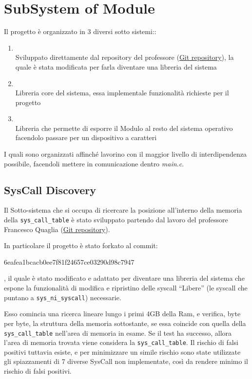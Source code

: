 \section{SubSystem of Module}

Il progetto è organizzato in 3 diversi sotto sistemi::
\begin{enumerate}
\item {} \\
    Sviluppato direttamente dal repository del professore
    (\href{https://github.com/FrancescoQuaglia/Linux-sys_call_table-discoverer}{Git repository}), la quale è stata
    modificata per farla diventare una libreria del sistema
\item {} \\
    Libreria core del sistema, essa implementale funzionalità richieste per il progetto
\item {} \\
    Libreria che permette di esporre il Modulo al resto del sistema operativo facendolo passare per un dispositivo a
    caratteri
\end{enumerate}

I quali sono organizzati affinché lavorino con il maggior livello di interdipendenza possibile, facendoli mettere in
comunicazione dentro \textit{main.c}.

\subsection{SysCall Discovery} \label{SysCallDiscovery}

Il Sotto-sistema che si occupa di ricercare la posizione all'interno della memoria della \verb|sys_call_table| è stato
sviluppato partendo dal lavoro del professore Francesco Quaglia
(\href{https://github.com/FrancescoQuaglia/Linux-sys_call_table-discoverer}{Git repository}).

In particolare il progetto è stato forkato al commit:
\begin{verb}6eafea1bcacb0ee7f81f24657ce03290d98c7947\end{verb}, il quale è stato modificato e
adattato per diventare una libreria del sistema che espone la funzionalità di modifica e ripristino delle syscall
``Libere'' (le syscall che puntano a \verb|sys_ni_syscall|) necessarie.

Esso comincia una ricerca lineare lungo i primi 4GB della Ram, e verifica, byte per byte, la struttura della memoria
sottostante, se essa coincide con quella della \verb|sys_call_table| nell'area di memoria in esame.
Se il test ha successo, allora l'area di memoria trovata viene considera la \verb|sys_call_table|.
Il rischio di falsi positivi tuttavia esiste, e per minimizzare un simile rischio sono state utilizzate gli
spiazzamenti di 7 diverse SysCall non implementate, così da rendere minimo il rischio di falsi positivi.

